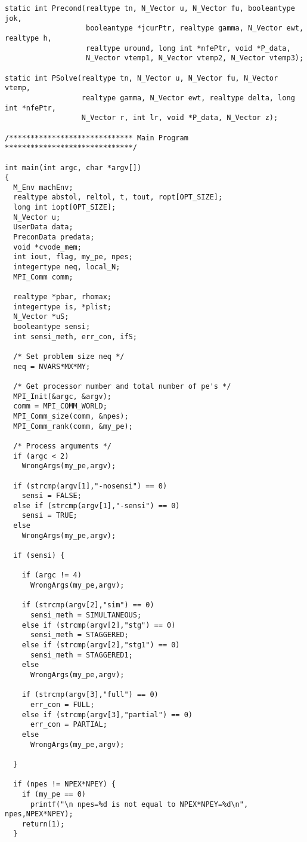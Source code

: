 \begin{verbatim}
static int Precond(realtype tn, N_Vector u, N_Vector fu, booleantype jok,
                   booleantype *jcurPtr, realtype gamma, N_Vector ewt, realtype h,
                   realtype uround, long int *nfePtr, void *P_data,
                   N_Vector vtemp1, N_Vector vtemp2, N_Vector vtemp3);

static int PSolve(realtype tn, N_Vector u, N_Vector fu, N_Vector vtemp,
                  realtype gamma, N_Vector ewt, realtype delta, long int *nfePtr,
                  N_Vector r, int lr, void *P_data, N_Vector z);

/***************************** Main Program ******************************/

int main(int argc, char *argv[])
{
  M_Env machEnv;
  realtype abstol, reltol, t, tout, ropt[OPT_SIZE];
  long int iopt[OPT_SIZE];
  N_Vector u;
  UserData data;
  PreconData predata;
  void *cvode_mem;
  int iout, flag, my_pe, npes;
  integertype neq, local_N;
  MPI_Comm comm;

  realtype *pbar, rhomax;
  integertype is, *plist;
  N_Vector *uS;
  booleantype sensi;
  int sensi_meth, err_con, ifS;

  /* Set problem size neq */
  neq = NVARS*MX*MY;

  /* Get processor number and total number of pe's */
  MPI_Init(&argc, &argv);
  comm = MPI_COMM_WORLD;
  MPI_Comm_size(comm, &npes);
  MPI_Comm_rank(comm, &my_pe);

  /* Process arguments */
  if (argc < 2)
    WrongArgs(my_pe,argv);

  if (strcmp(argv[1],"-nosensi") == 0)
    sensi = FALSE;
  else if (strcmp(argv[1],"-sensi") == 0)
    sensi = TRUE;
  else
    WrongArgs(my_pe,argv);

  if (sensi) {

    if (argc != 4)
      WrongArgs(my_pe,argv);

    if (strcmp(argv[2],"sim") == 0)
      sensi_meth = SIMULTANEOUS;
    else if (strcmp(argv[2],"stg") == 0)
      sensi_meth = STAGGERED;
    else if (strcmp(argv[2],"stg1") == 0)
      sensi_meth = STAGGERED1;
    else 
      WrongArgs(my_pe,argv);

    if (strcmp(argv[3],"full") == 0)
      err_con = FULL;
    else if (strcmp(argv[3],"partial") == 0)
      err_con = PARTIAL;
    else
      WrongArgs(my_pe,argv);

  }

  if (npes != NPEX*NPEY) {
    if (my_pe == 0)
      printf("\n npes=%d is not equal to NPEX*NPEY=%d\n", npes,NPEX*NPEY);
    return(1);
  }


\end{verbatim}

